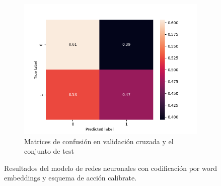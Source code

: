 \begin{figure}
\begin{subfigure}[b]{\textwidth}
    \includegraphics[width=\linewidth]{figures/results/word_embeddings/nn/calibrate/calibrate_set_6_confusion_matrix_percent.png}
    \endminipage
    \caption{Matrices de confusión en validación cruzada y el conjunto de test}
    \end{subfigure}
    \caption{Resultados del modelo de redes neuronales con codificación por word embeddings y esquema de acción calibrate.}
\end{figure}



